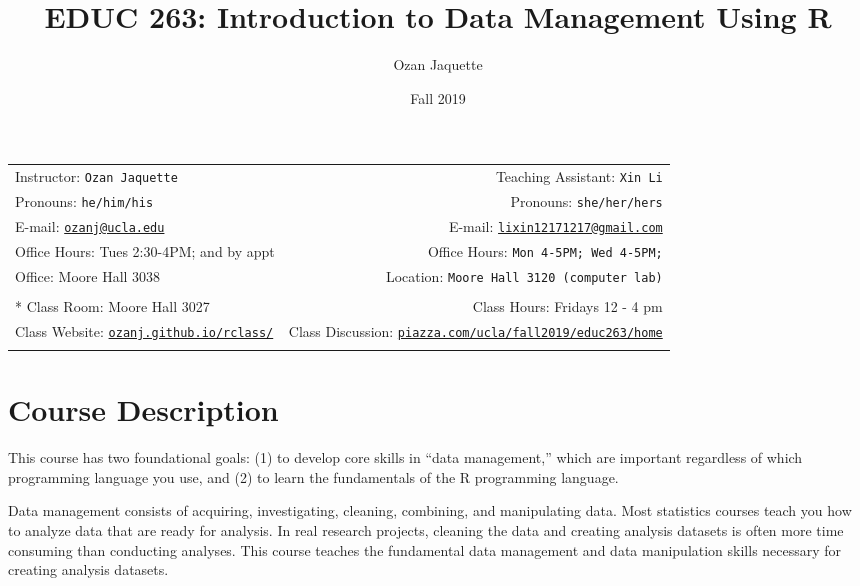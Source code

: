 \documentclass[11pt,]{article}
\title{EDUC 263: Introduction to Data Management Using R}
\author{Ozan Jaquette}
\date{Fall 2019}
\begin{document}
  

		\maketitle
		
	
		\thispagestyle{firststyle}



	\noindent \begin{tabular*}{\textwidth}{ @{\extracolsep{\fill}} lr @{\extracolsep{\fill}}}


Instructor: \texttt{Ozan Jaquette} & Teaching Assistant: \texttt{Xin Li} \\
Pronouns: \texttt{he/him/his} & Pronouns: \texttt{she/her/hers} \\
E-mail: \texttt{\href{mailto:ozanj@ucla.edu}{\nolinkurl{ozanj@ucla.edu}}} & E-mail: \texttt{\href{mailto:lixin12171217@gmail.com}{\nolinkurl{lixin12171217@gmail.com}}} \\ 
Office Hours: Tues 2:30-4PM; and by appt  & Office Hours: \texttt{Mon 4-5PM; Wed 4-5PM;} \\
Office: Moore Hall 3038 & Location: \texttt{Moore Hall 3120 (computer lab)} \\
\\ *
Class Room: Moore Hall 3027 & Class Hours: Fridays 12 - 4 pm\\
Class Website: \href{http://ozanj.github.io/rclass/}{\tt ozanj.github.io/rclass/} & Class Discussion: \href{http://piazza.com/ucla/fall2019/educ263/home}{\tt piazza.com/ucla/fall2019/educ263/home}\\
	&  \\
	\hline
	\end{tabular*}
	
\vspace{2mm}
	


\hypertarget{course-description}{%
\section{Course Description}\label{course-description}}

This course has two foundational goals: (1) to develop core skills in
``data management,'' which are important regardless of which programming
language you use, and (2) to learn the fundamentals of the R programming
language.

Data management consists of acquiring, investigating, cleaning,
combining, and manipulating data. Most statistics courses teach you how
to analyze data that are ready for analysis. In real research projects,
cleaning the data and creating analysis datasets is often more time
consuming than conducting analyses. This course teaches the fundamental
data management and data manipulation skills necessary for creating
analysis datasets.
\end{document}
